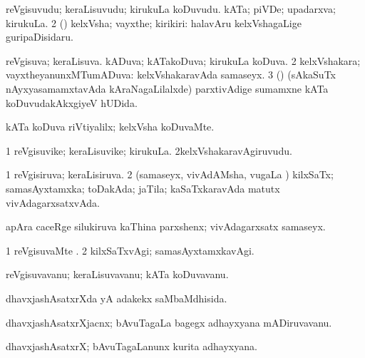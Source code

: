 \bentry
{} 
\gl{\nA}
\expl{}
\bmng
\bnum
{} 
\banum
{} reVgisuvudu; keraLisuvudu; kirukuLa koDuvudu. 
 kATa; piVDe; upadarxva; kirukuLa. 
\eanum
\numie
\num{2} (\pArxparx) kelxVsha; vayxthe; kirikiri:  halavAru kelxVshagaLige guripaDisidaru. 
\enum
\emng
\eentry

\bentry
{} 
\gl{\gu}
\expl{}
\bmng
\bnum
{} 
\banum
{} reVgisuva; keraLisuva. 
 kADuva; kATakoDuva; kirukuLa koDuva. 
\eanum
\numie
\num{2} kelxVshakara; vayxtheyanunxMTumADuva:  kelxVshakaravAda samaseyx. 
\num{3} (\nAyxshA) (sAkaSuTx nAyxyasamamxtavAda kAraNagaLilalxde) parxtivAdige sumamxne kATa koDuvudakAkxgiyeV hUDida. 
\enum
\emng
\eentry

\bentry
{} 
\gl{\kirxvi}
\expl{}
\bmng
 kATa koDuva riVtiyalilx; kelxVsha koDuvaMte. 
\emng
\eentry

\bentry
{} 
\gl{\nA}
\expl{}
\bmng
\bnum
\num{1} reVgisuvike; keraLisuvike; kirukuLa. 
\num{2}kelxVshakaravAgiruvudu. 
\enum
\emng
\eentry

\bentry
{} 
\gl{\gu}
\expl{}
\bmng
\bnum
\num{1} reVgisiruva; keraLisiruva. 
\num{2} (samaseyx, vivAdAMsha, \mo vugaLa \vi) kilxSaTx; samasAyxtamxka; toDakAda; jaTila; kaSaTxkaravAda matutx vivAdagarxsatxvAda. 
\enum
\emng

\noindent 
\gl{\pagu}
\expl{}
\bmng
  apAra caceRge silukiruva kaThina parxshenx; vivAdagarxsatx samaseyx. 
\emng
\eentry

\bentry
{} 
\gl{\kirxvi}
\expl{}
\bmng
\bnum
\num{1} reVgisuvaMte . 
\num{2} kilxSaTxvAgi; samasAyxtamxkavAgi. 
\enum
\emng
\eentry

\bentry
{} 
\gl{\nA}
\expl{}
\bmng
 reVgisuvavanu; keraLisuvavanu; kATa koDuvavanu. 
\emng
\eentry

\bentry
{} 
\gl{\gu}
\expl{}
\bmng
 dhavxjashAsatxrXda yA adakekx saMbaMdhisida. 
\emng
\eentry

\bentry
{} 
\gl{\nA}
\expl{}
\bmng
 dhavxjashAsatxrXjacnx; bAvuTagaLa bagegx adhayxyana mADiruvavanu. 
\emng
\eentry

\bentry
{} 
\gl{\nA}
\expl{}
\bmng
 dhavxjashAsatxrX; bAvuTagaLanunx kurita adhayxyana. 
\emng
\eentry

